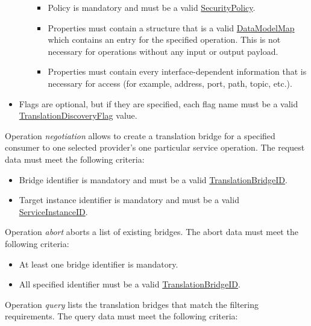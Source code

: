 \documentclass[a4paper]{arrowhead}
\newcommand{\pref}[1]{{\textcolor{ArrowheadGrey}{\hyperref[sec:model:primitives:#1]{#1}}}}
\begin{document}
\begin{itemize}
\begin{itemize}
\begin{itemize}
            \item Policy is mandatory and must be a valid \pref{SecurityPolicy}.
            \item Properties must contain a structure that is a valid \hyperref[sec:model:DataModelMap]{DataModelMap} which contains an entry for the specified operation. This is not necessary for operations without any input or output payload.
            \item Properties must contain every interface-dependent information that is necessary for access (for example, address, port, path, topic, etc.).
        \end{itemize}
    \end{itemize}
    \item Flags are optional, but if they are specified, each flag name must be a valid \pref{TranslationDiscoveryFlag} value.
\end{itemize}


Operation \textit{negotiation} allows to create a translation bridge for a specified consumer to one selected provider's one particular service operation. The request data must meet the following criteria:

\begin{itemize}
    \item Bridge identifier is mandatory and must be a valid \pref{TranslationBridgeID}.
    \item Target instance identifier is mandatory and  must be a valid \pref{ServiceInstanceID}.
\end{itemize}


Operation \textit{abort} aborts a list of existing bridges. The abort data must meet the following criteria:

\begin{itemize}
    \item At least one bridge identifier is mandatory.
    \item All specified identifier must be a valid \pref{TranslationBridgeID}.
\end{itemize}


Operation \textit{query} lists the translation bridges that match the filtering requirements. The query data must meet the following criteria:
\end{document}
